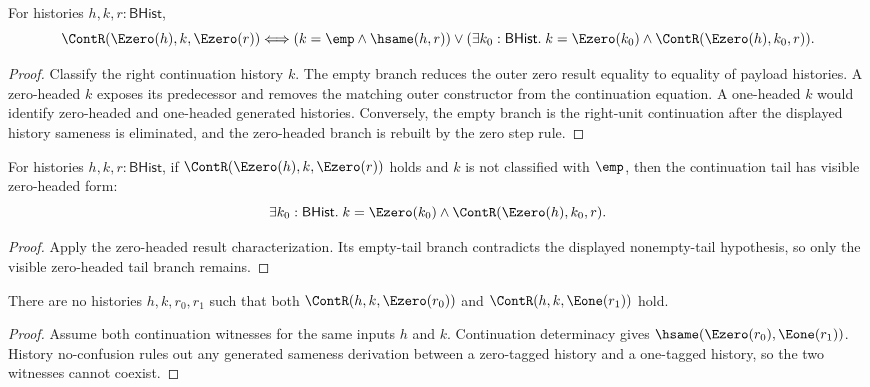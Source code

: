 \begin{theorem}
\label{thm:cont-left-e0-result-iff}
For histories $h,k,r:\mathsf{BHist}$,
$$
\ContR(\Ezero(h),k,\Ezero(r))
\Longleftrightarrow
(k=\emp\land \hsame(h,r))
\lor
(\exists k_0:\mathsf{BHist}.\; k=\Ezero(k_0)\land
\ContR(\Ezero(h),k_0,r)).
$$
\end{theorem}
\begin{proof}
Classify the right continuation history $k$. The empty branch reduces the
outer zero result equality to equality of payload histories. A zero-headed $k$
exposes its predecessor and removes the matching outer constructor from the
continuation equation. A one-headed $k$ would identify zero-headed and
one-headed generated histories. Conversely, the empty branch is the right-unit
continuation after the displayed history sameness is eliminated, and the
zero-headed branch is rebuilt by the zero step rule.
\end{proof}

\begin{proposition}
\label{prop:cont-left-e0-result-nonempty-tail-cases}
For histories $h,k,r:\mathsf{BHist}$, if
$\ContR(\Ezero(h),k,\Ezero(r))$ holds and $k$ is not classified with $\emp$,
then the continuation tail has visible zero-headed form:
$$
\exists k_0:\mathsf{BHist}.\;
k=\Ezero(k_0)\land \ContR(\Ezero(h),k_0,r).
$$
\end{proposition}
\begin{proof}
Apply the zero-headed result characterization. Its empty-tail branch
contradicts the displayed nonempty-tail hypothesis, so only the visible
zero-headed tail branch remains.
\end{proof}

\begin{theorem}
\label{thm:continuation-result-tag-separation}
There are no histories $h,k,r_0,r_1$ such that both
$\ContR(h,k,\Ezero(r_0))$ and $\ContR(h,k,\Eone(r_1))$ hold.
\end{theorem}
\begin{proof}
Assume both continuation witnesses for the same inputs $h$ and $k$.
Continuation determinacy gives $\hsame(\Ezero(r_0),\Eone(r_1))$. History
no-confusion rules out any generated sameness derivation between a zero-tagged
history and a one-tagged history, so the two witnesses cannot coexist.
\end{proof}

